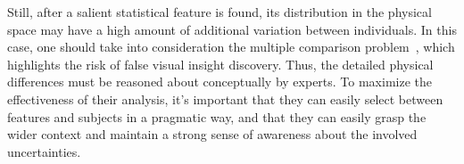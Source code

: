 Still, after a salient statistical feature is found, its distribution in the physical space may have a high amount of additional variation between individuals. In this case, one should take into consideration the multiple comparison problem~\cite{benjamini2010simultaneous,zgraggen2018investigating}, which highlights the risk of false visual insight discovery. Thus, the detailed physical differences must be reasoned about conceptually by experts. To maximize the effectiveness of their analysis, it's important that they can easily select between features and subjects in a pragmatic way, and that they can easily grasp the wider context and maintain a strong sense of awareness about the involved uncertainties. 


